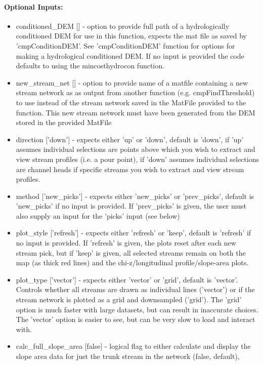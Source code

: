 \paragraph{Optional Inputs:}
\begin{itemize}
\item conditioned\_DEM [] - option to provide full path of a hydrologically conditioned DEM for use in this function, expects the mat file as saved by 
'cmpConditionDEM'. See 'cmpConditionDEM' function for options for making a hydrological conditioned DEM. If no input is provided the code defaults 
to using the mincosthydrocon function.
\item new\_stream\_net [] - option to provide name of a matfile containing a new stream network as as output from another function (e.g. cmpFindThreshold) to use
instead of the stream network saved in the MatFile provided to the function. This new stream network must have been generated from the
DEM stored in the provided MatFile
\item direction ['down'] - expects either 'up' or 'down', default is 'down', if 'up' assumes individual selections are points above
which you wish to extract and view stream profiles (i.e. a pour point), if 'down' assumes individual
selections are channel heads if specific streams you wish to extract and view stream profiles. 
\item method ['new\_picks'] - expects either 'new\_picks' or 'prev\_picks', default is 'new\_picks' if no input is provided. If 'prev\_picks' is
given, the user must also supply an input for the 'picks' input (see below)
\item plot\_style ['refresh'] - expects either 'refresh' or 'keep', default is 'refresh' if no input is provided. If 'refresh' is given, the plots reset
after each new stream pick, but if 'keep' is given, all selected streams remain on both the map (as thick red lines) and the
chi-z/longitudinal profile/slope-area plots.
\item plot\_type ['vector'] - expects either 'vector' or 'grid', default is 'vector'. Controls whether all streams are drawn as individual lines ('vector') or if
the stream network is plotted as a grid and downsampled ('grid'). The 'grid' option is much faster with large datasets, 
but can result in inaccurate choices. The 'vector' option is easier to see, but can be very slow to load and interact with.
\item calc\_full\_slope\_area [false] - logical flag to either calculate and display the slope area data for just the trunk stream in the network (false, default),

\end{itemize}
